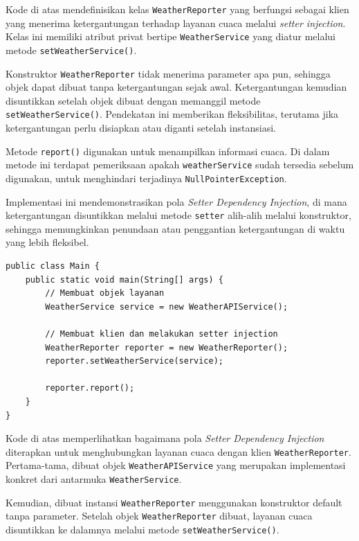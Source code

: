 Kode di atas mendefinisikan kelas \texttt{WeatherReporter} yang berfungsi sebagai klien yang menerima ketergantungan terhadap layanan cuaca melalui \textit{setter injection}. Kelas ini memiliki atribut privat bertipe \texttt{WeatherService} yang diatur melalui metode \texttt{setWeatherService()}.

Konstruktor \texttt{WeatherReporter} tidak menerima parameter apa pun, sehingga objek dapat dibuat tanpa ketergantungan sejak awal. Ketergantungan kemudian disuntikkan setelah objek dibuat dengan memanggil metode \texttt{setWeatherService()}. Pendekatan ini memberikan fleksibilitas, terutama jika ketergantungan perlu disiapkan atau diganti setelah instansiasi.

Metode \texttt{report()} digunakan untuk menampilkan informasi cuaca. Di dalam metode ini terdapat pemeriksaan apakah \texttt{weatherService} sudah tersedia sebelum digunakan, untuk menghindari terjadinya \texttt{NullPointerException}.

Implementasi ini mendemonstrasikan pola \textit{Setter Dependency Injection}, di mana ketergantungan disuntikkan melalui metode \texttt{setter} alih-alih melalui konstruktor, sehingga memungkinkan penundaan atau penggantian ketergantungan di waktu yang lebih fleksibel.

\begin{lstlisting}[style=JavaStyle, caption={Kode Main untuk Menjalankan Setter Dependency Injection pada Weather Reporter}, label={lst:di-weather-main-setter}]
public class Main {
	public static void main(String[] args) {
		// Membuat objek layanan
		WeatherService service = new WeatherAPIService();
		
		// Membuat klien dan melakukan setter injection
		WeatherReporter reporter = new WeatherReporter();
		reporter.setWeatherService(service);
		
		reporter.report();
	}
}
\end{lstlisting}

Kode di atas memperlihatkan bagaimana pola \textit{Setter Dependency Injection} diterapkan untuk menghubungkan layanan cuaca dengan klien \texttt{WeatherReporter}. Pertama-tama, dibuat objek \texttt{WeatherAPIService} yang merupakan implementasi konkret dari antarmuka \texttt{WeatherService}. 

Kemudian, dibuat instansi \texttt{WeatherReporter} menggunakan konstruktor default tanpa parameter. Setelah objek \texttt{WeatherReporter} dibuat, layanan cuaca disuntikkan ke dalamnya melalui metode \texttt{setWeatherService()}. 

